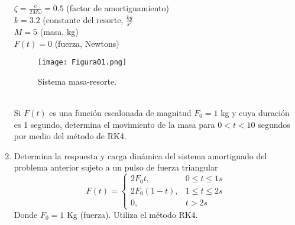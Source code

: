 \documentclass[12pt]{article}
\begin{document}
\begin{enumerate}
$\zeta = \frac{c}{2M\omega}=0.5$ (factor de amortiguamiento) \\
$k = 3.2$ (constante del resorte, $\frac{kg}{s^{2}}$ \\
$M=5$ (masa, kg) \\
$F(t) = 0$ (fuerza, Newtons)
\begin{figure}[!h]
	\centering
	\texttt{[image: Figura01.png]}  
	\label{fig:figura01}
	\caption{Sistema masa-resorte.}
\end{figure}
\\Si $F(t)$ es una funci\'{o}n escalonada de magnitud $F_{0}=1$ kg y cuya duraci\'{o}n es 1 segundo, determina el movimiento de la masa para $0<t<10$ segundos por medio del m\'{e}todo de RK4.
\item Determina la respuesta y carga din\'{a}mica del sistema amortiguado del problema anterior sujeto a un pulso de fuerza triangular
\begin{equation*}
	F(t) =
		\begin{cases}
			2F_{0}t,  & 0 \leq t \leq 1 s\\
			2F_{0}(1-t), & 1 \leq t \leq 2 s\\
			0, & t>2 s
		\end{cases}
\end{equation*}
Donde $F_{0}=1$ Kg (fuerza). Utiliza el m\'{e}todo RK4.
\end{enumerate}
\end{document}
